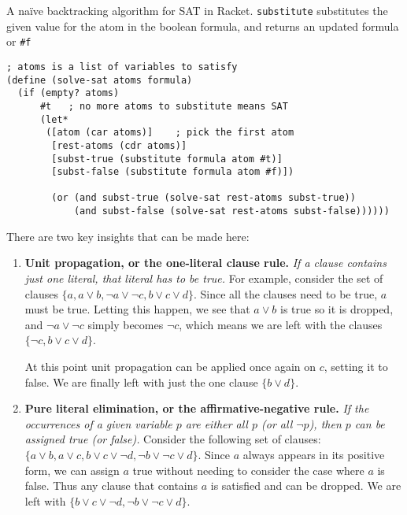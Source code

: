 \begin{program}

\caption[A na\"{i}ve backtracking algorithm for SAT in Racket]
{A na\"{i}ve backtracking algorithm for SAT in Racket.
\texttt{substitute} substitutes the given value for the atom in the boolean
formula, and returns an updated formula or \texttt{\#f}}

\label{fig:sat-backtracking}
\begin{verbatim}
; atoms is a list of variables to satisfy
(define (solve-sat atoms formula)
  (if (empty? atoms)
      #t   ; no more atoms to substitute means SAT
      (let*
       ([atom (car atoms)]    ; pick the first atom
        [rest-atoms (cdr atoms)]
        [subst-true (substitute formula atom #t)]
        [subst-false (substitute formula atom #f)])

        (or (and subst-true (solve-sat rest-atoms subst-true))
            (and subst-false (solve-sat rest-atoms subst-false))))))
\end{verbatim}
\end{program}

There are two key insights that can be made here:

\begin{enumerate}

\item \textbf{Unit propagation, or the one-literal clause rule.} \textit{If a
clause contains just one literal, that literal has to be true.} For example,
consider the set of clauses $\{a, a \vee b, \neg a \vee \neg c, b \vee c \vee
d\}$. Since all the clauses need to be true, $a$ must be true. Letting this
happen, we see that $a \vee b$ is true so it is dropped, and $\neg a \vee \neg
c$ simply becomes $\neg c$, which means we are left with the clauses $\{\neg
c, b \vee c \vee d\}$.

At this point unit propagation can be applied once again on $c$, setting it to
false. We are finally left with just the one clause $\{b \vee d\}$.

\item \textbf{Pure literal elimination, or the affirmative-negative rule.}
\textit{If the occurrences of a given variable $p$ are either all $p$ (or all
$\neg p$), then $p$ can be assigned true (or false).} Consider the following
set of clauses: $\{a \vee b, a \vee c, b \vee c \vee \neg d, \neg b \vee \neg
c \vee d\}$. Since $a$ always appears in its positive form, we can assign $a$
true without needing to consider the case where $a$ is false. Thus any clause
that contains $a$ is satisfied and can be dropped. We are left with $\{b \vee
c \vee \neg d, \neg b \vee \neg c \vee d\}$.

\end{enumerate}

